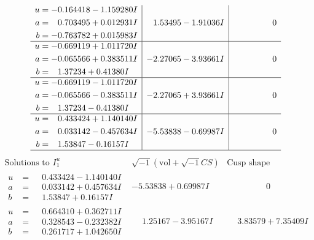 \documentclass[1p]{elsarticle_modified}
\theoremstyle{definition}
\newcommand{\I}{\sqrt{-1}}
\begin{document}
$$\begin{array}{c|c|c}
\begin{aligned}
u &= -0.164418 - 1.159280 I \\
a &= \phantom{-}0.703495 + 0.012931 I \\
b &= -0.763782 + 0.015983 I\end{aligned}
 & \phantom{-}1.53495 - 1.91036 I & \phantom{-0.000000 } 0 \\ \hline\begin{aligned}
u &= -0.669119 + 1.011720 I \\
a &= -0.065566 + 0.383511 I \\
b &= \phantom{-}1.37234 + 0.41380 I\end{aligned}
 & -2.27065 - 3.93661 I & \phantom{-0.000000 } 0 \\ \hline\begin{aligned}
u &= -0.669119 - 1.011720 I \\
a &= -0.065566 - 0.383511 I \\
b &= \phantom{-}1.37234 - 0.41380 I\end{aligned}
 & -2.27065 + 3.93661 I & \phantom{-0.000000 } 0 \\ \hline\begin{aligned}
u &= \phantom{-}0.433424 + 1.140140 I \\
a &= \phantom{-}0.033142 - 0.457634 I \\
b &= \phantom{-}1.53847 - 0.16157 I\end{aligned}
 & -5.53838 - 0.69987 I & \phantom{-0.000000 } 0\\
 \hline 
 \end{array}$$\newpage$$\begin{array}{c|c|c}  
\text{Solutions to }I^u_{1}& \I (\text{vol} + \sqrt{-1}CS) & \text{Cusp shape}\\
 \hline 
\begin{aligned}
u &= \phantom{-}0.433424 - 1.140140 I \\
a &= \phantom{-}0.033142 + 0.457634 I \\
b &= \phantom{-}1.53847 + 0.16157 I\end{aligned}
 & -5.53838 + 0.69987 I & \phantom{-0.000000 } 0 \\ \hline\begin{aligned}
u &= \phantom{-}0.664310 + 0.362711 I \\
a &= \phantom{-}0.328543 - 0.232382 I \\
b &= \phantom{-}0.261717 + 1.042650 I\end{aligned}
 & \phantom{-}1.25167 - 3.95167 I & \phantom{-}3.83579 + 7.35409 I \\ \hline\begin{aligned}

\end{aligned}
\end{array}$$
\end{document}
